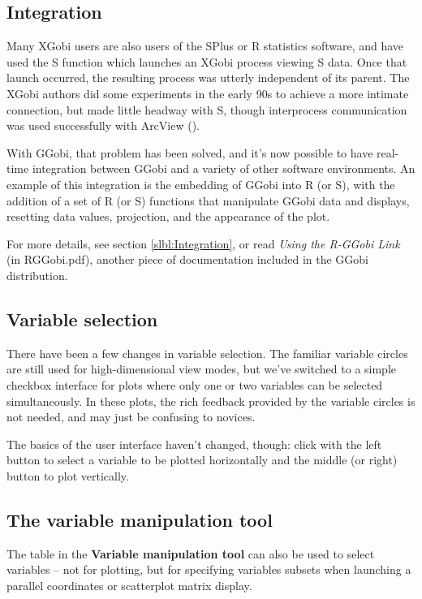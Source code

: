 \documentclass[11pt]{article}
\begin{document}
\subsection{Integration}

Many XGobi users are also users of the SPlus or R statistics software, and
have used the S function which launches an XGobi process viewing S data.
Once that launch occurred, the resulting process was utterly independent
of its parent.  The XGobi authors did some experiments in the early 90s
to achieve a more intimate connection, but made little headway with S,
though interprocess communication was used successfully with ArcView
(\cite{SwayneBujaHubbell91,SMCM97}).

With GGobi, that problem has been solved, and it's now possible
to have real-time integration between GGobi and a variety of
other software environments.  An example of this integration is
the embedding of GGobi into R (or S), with the addition of a set of
R (or S) functions that manipulate GGobi data and displays,
resetting data values, projection, and the appearance of the plot.

For more details, see section \ref{slbl:Integration}, or read
{\em Using the R-GGobi Link} (in RGGobi.pdf), another piece of
documentation included in the GGobi distribution.

\subsection {Variable selection}

There have been a few changes in variable selection.  The familiar
variable circles are still used for high-dimensional view modes, but
we've switched to a simple checkbox interface for plots where only one
or two variables can be selected simultaneously.  In these plots, the
rich feedback provided by the variable circles is not needed, and may
just be confusing to novices.

The basics of the user interface haven't changed, though:
click with the left button to select a variable to be plotted
horizontally and the middle (or right) button to plot vertically.

\subsection {The variable manipulation tool}

The table in the {\bf Variable manipulation tool} can also be used to
select variables -- not for plotting, but for specifying variables
subsets when launching a parallel coordinates or scatterplot matrix display.
\end{document}
